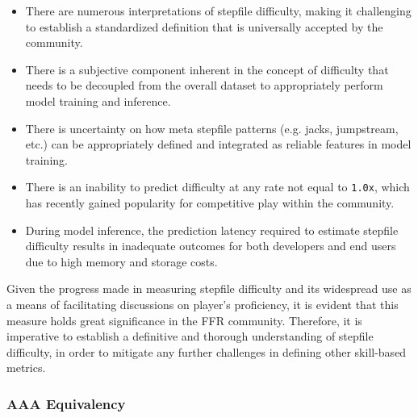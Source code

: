 \begin{itemize}
	\item There are numerous interpretations of stepfile difficulty, making it challenging to establish a standardized definition that is universally accepted by the community.
	\item There is a subjective component inherent in the concept of difficulty that needs to be decoupled from the overall dataset to appropriately perform model training and inference.
	\item There is uncertainty on how meta stepfile patterns (e.g. jacks, jumpstream, etc.) can be appropriately defined and integrated as reliable features in model training. 
	\item There is an inability to 
	      predict difficulty at any rate not equal to \texttt{1.0x}, which has recently gained popularity for competitive play within the community.

       \item During model inference, the prediction latency required to estimate stepfile difficulty results in inadequate outcomes for both developers and end users due to high memory and storage costs.
\end{itemize}

Given the progress made in measuring stepfile difficulty and its widespread use as a means of facilitating discussions on player's proficiency, it is evident that this measure holds great significance in the FFR community. Therefore, it is imperative to establish a definitive and thorough understanding of stepfile difficulty, in order to mitigate any further challenges in defining other skill-based metrics.

\subsubsection{AAA Equivalency}

